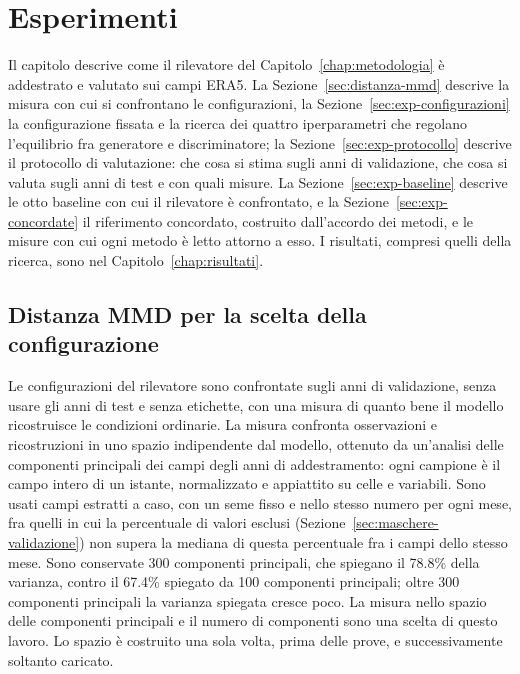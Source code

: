 \chapter{Esperimenti}
\label{chap:esperimenti}

Il capitolo descrive come il rilevatore del Capitolo~\ref{chap:metodologia} è addestrato e valutato sui campi ERA5. La Sezione~\ref{sec:distanza-mmd} descrive la misura con cui si confrontano le configurazioni, la Sezione~\ref{sec:exp-configurazioni} la configurazione fissata e la ricerca dei quattro iperparametri che regolano l'equilibrio fra generatore e discriminatore; la Sezione~\ref{sec:exp-protocollo} descrive il protocollo di valutazione: che cosa si stima sugli anni di validazione, che cosa si valuta sugli anni di test e con quali misure. La Sezione~\ref{sec:exp-baseline} descrive le otto baseline con cui il rilevatore è confrontato, e la Sezione~\ref{sec:exp-concordate} il riferimento concordato, costruito dall'accordo dei metodi, e le misure con cui ogni metodo è letto attorno a esso. I risultati, compresi quelli della ricerca, sono nel Capitolo~\ref{chap:risultati}.

\section{Distanza MMD per la scelta della configurazione}
\label{sec:monitoraggio-senza-etichette}
\label{sec:distanza-mmd}

Le configurazioni del rilevatore sono confrontate sugli anni di validazione, senza usare gli anni di test e senza etichette, con una misura di quanto bene il modello ricostruisce le condizioni ordinarie. La misura confronta osservazioni e ricostruzioni in uno spazio indipendente dal modello, ottenuto da un'analisi delle componenti principali dei campi degli anni di addestramento: ogni campione è il campo intero di un istante, normalizzato e appiattito su celle e variabili. Sono usati campi estratti a caso, con un seme fisso e nello stesso numero per ogni mese, fra quelli in cui la percentuale di valori esclusi (Sezione~\ref{sec:maschere-validazione}) non supera la mediana di questa percentuale fra i campi dello stesso mese. Sono conservate 300 componenti principali, che spiegano il 78.8\% della varianza, contro il 67.4\% spiegato da 100 componenti principali; oltre 300 componenti principali la varianza spiegata cresce poco. La misura nello spazio delle componenti principali e il numero di componenti sono una scelta di questo lavoro. Lo spazio è costruito una sola volta, prima delle prove, e successivamente soltanto caricato.

